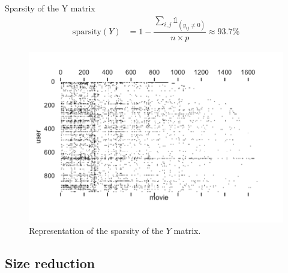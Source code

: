 \documentclass[unknownkeysallowed]{beamer}
\begin{document}
\begin{frame}{Sparsity of the Y matrix}
\begin{align*}
    \text{sparsity}(Y)&= 1 - \dfrac{\sum_{i,j} \mathds{1}_{(y_{ij} \neq 0)}}{n\times p} \approx 93.7 \%
\end{align*}

\begin{figure}[H]
\centering
  \includegraphics[scale=0.53]{./images/sparse.pdf}
  \caption{Representation of the sparsity of the $Y$ matrix.}
  \label{fig:sparse_fig}
\end{figure}

\end{frame}


\subsection{Size reduction}
\label{sec:reduction}
\end{document}
